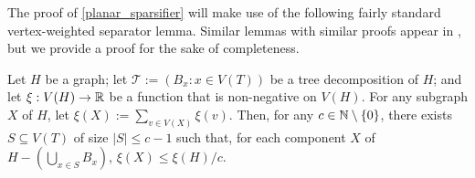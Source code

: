 \documentclass{patmorin}
\renewcommand{\ge}{\geqslant}
\renewcommand{\le}{\leqslant}
\renewcommand{\geq}{\geqslant}
\newcommand{\david}[1]{{\color{orange} David: #1}}
\newcommand{\pat}[1]{\textcolor{Blue}{Pat: #1}}
\begin{document}


The proof of \cref{planar_sparsifier} will make use of the following fairly standard vertex-weighted separator lemma.  Similar lemmas with similar proofs appear in  \citet{robertson.seymour:graph}, but we provide a proof for the sake of completeness.


\begin{lem}\label{weighted_separator}
    Let $H$ be a graph; let $\mathcal{T}:=(B_x:x\in V(T))$ be a tree decomposition of $H$; and let $\xi:V(H)\to\mathbb{R}$ be a function that is non-negative on $V(H)$.  For any subgraph $X$ of $H$, let  $\xi(X):=\sum_{v\in V(X)} \xi(v)$.
    Then, for any $c\in\mathbb{N}\setminus\{0\}$, there exists $S\subseteq V(T)$ of size $|S|\le c-1$ such that, for each component $X$ of $H-(\bigcup_{x\in S} B_x)$, $\xi(X)\le \xi(H)/c$.
\end{lem}
\end{document}

